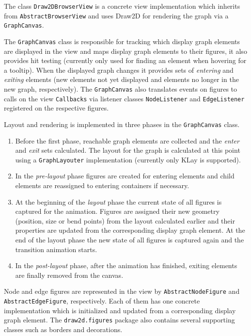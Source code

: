 The class \lstinline|Draw2DBrowserView| is a concrete view implementation which inherits from 
\lstinline|AbstractBrowserView| and uses Draw2D for rendering the graph via a \lstinline|GraphCanvas|.

The \lstinline|GraphCanvas| class is responsible for tracking which display graph elements are displayed in the view 
and maps display graph elements to their figures, it also provides hit testing (currently only used for finding an 
element when hovering for a tooltip). When the displayed graph changes it provides sets of \emph{entering} and 
\emph{exiting} elements (new elements not yet displayed and elements no longer in the new graph, respectively). The 
\lstinline|GraphCanvas| also translates events on figures to calls on the view \lstinline|Callbacks| via listener 
classes \lstinline|NodeListener| and \lstinline|EdgeListener| registered on the respective figures.

Layout and rendering is implemented in three phases in the \lstinline|GraphCanvas| class.
\begin{enumerate}[start=0]
  \item Before the first phase, reachable graph elements are collected and the \emph{enter} and \emph{exit} sets 
  calculated. The layout for the graph is calculated at this point using a \lstinline|GraphLayouter| implementation 
  (currently only KLay is supported).
  
  \item In the \emph{pre-layout} phase figures are created for entering elements and child elements are reassigned to 
  entering containers if necessary.
  
  \item At the beginning of the \emph{layout} phase the current state of all figures is captured for the animation. 
  Figures are assigned their new geometry (position, size or bend points) from the layout calculated earlier and their 
  properties are updated from the corresponding display graph element. At the end of the layout phase the new state of 
  all figures is captured again and the transition animation starts.
  
  \item In the \emph{post-layout} phase, after the animation has finished, exiting elements are finally removed from 
  the canvas.
\end{enumerate}

Node and edge figures are represented in the view by \lstinline|AbstractNodeFigure| and \lstinline|AbstractEdgeFigure|, 
respectively. Each of them has one concrete implementation which is initialized and updated from a corresponding 
display graph element. The \lstinline|draw2d.figures| package also contains several supporting classes such as borders 
and decorations.

